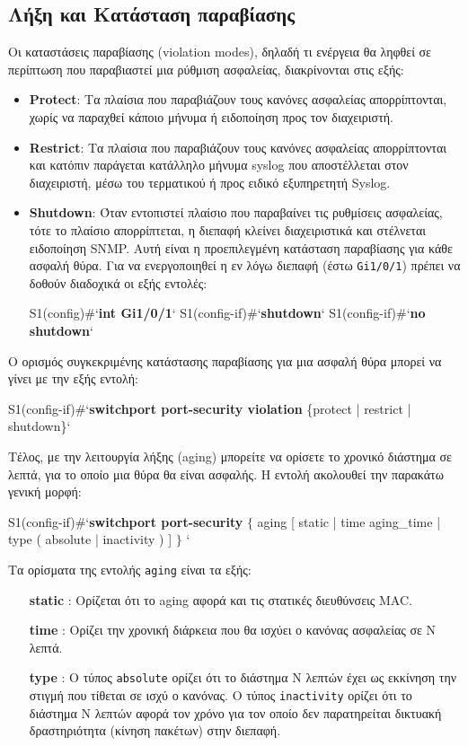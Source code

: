 \documentclass{EdipyLabs} %
\begin{document}
\subsection{Λήξη και Κατάσταση παραβίασης}
Οι καταστάσεις παραβίασης (violation modes), δηλαδή τι ενέργεια θα ληφθεί σε περίπτωση που παραβιαστεί μια ρύθμιση ασφαλείας, διακρίνονται στις εξής:
\begin{itemize}
	\item \textbf{Protect}: Τα πλαίσια που παραβιάζουν τους κανόνες ασφαλείας απορρίπτονται, χωρίς να παραχθεί κάποιο μήνυμα ή ειδοποίηση προς τον διαχειριστή.
	\item \textbf{Restrict}: Τα πλαίσια που παραβιάζουν τους κανόνες ασφαλείας απορρίπτονται και κατόπιν παράγεται κατάλληλο μήνυμα syslog που αποστέλλεται στον διαχειριστή, μέσω του τερματικού ή προς ειδικό εξυπηρετητή Syslog.
	\item \textbf{Shutdown}: Όταν εντοπιστεί πλαίσιο που παραβαίνει τις ρυθμίσεις ασφαλείας, τότε το πλαίσιο απορρίπτεται, η διεπαφή κλείνει διαχειριστικά και στέλνεται ειδοποίηση SNMP. Αυτή είναι η προεπιλεγμένη κατάσταση παραβίασης για κάθε ασφαλή θύρα. Για να ενεργοποιηθεί η εν λόγω διεπαφή (έστω \texttt{Gi1/0/1}) πρέπει να δοθούν διαδοχικά οι εξής εντολές:
\begin{CommandBox}
S1(config)#`\textbf{int Gi1/0/1}`
S1(config-if)#`\textbf{shutdown}`
S1(config-if)#`\textbf{no shutdown}`
\end{CommandBox}
\end{itemize}

O ορισμός συγκεκριμένης κατάστασης παραβίασης για μια ασφαλή θύρα μπορεί να γίνει με την εξής εντολή:

\begin{CommandBox}
S1(config-if)#`\textbf{switchport port-security violation} \{protect | restrict | \\shutdown\}`
\end{CommandBox}

Τέλος, με την λειτουργία λήξης (aging) μπορείτε να ορίσετε το χρονικό διάστημα σε λεπτά, για το οποίο μια θύρα θα είναι ασφαλής. Η εντολή ακολουθεί την παρακάτω γενική μορφή:

\begin{CommandBox}
S1(config-if)#`\textbf{switchport port-security} $\{$ aging [ static | time aging\_time | type ( absolute | inactivity ) ] $\}$ `
\end{CommandBox}

Τα ορίσματα της εντολής \texttt{aging} είναι τα εξής:
\begin{itemize}
	\item[\textbf{static}]: Ορίζεται ότι το aging αφορά και τις στατικές διευθύνσεις MAC.
	\item[\textbf{time}]: Ορίζει την χρονική διάρκεια που θα ισχύει ο κανόνας ασφαλείας σε N λεπτά.
	\item[\textbf{type}]: Ο τύπος \texttt{absolute} ορίζει ότι το διάστημα Ν λεπτών έχει ως εκκίνηση την στιγμή που τίθεται σε ισχύ ο κανόνας. Ο τύπος \texttt{inactivity} ορίζει ότι το διάστημα N λεπτών αφορά τον χρόνο για τον οποίο δεν παρατηρείται δικτυακή δραστηριότητα (κίνηση πακέτων) στην διεπαφή.  
\end{itemize}
\newpage
\end{document}
